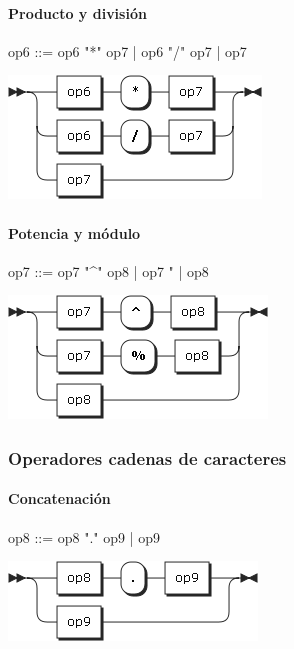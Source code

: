\paragraph{Producto y división}
\begin{multicols}{2}
\begin{myverbatim}      
op6  ::= op6 "*" op7
      |  op6 "/" op7
      |  op7
\end{myverbatim}  
\columnbreak	
\begin{center}
\includegraphics[scale=0.5]{diagram/op6.png} \\
\end{center}
\end{multicols}

\paragraph{Potencia y módulo}
\begin{multicols}{2}
\begin{myverbatim}      
op7  ::= op7 "^" op8
      |  op7 "%
      |  op8
\end{myverbatim}  
\columnbreak	
\begin{center}
\includegraphics[scale=0.5]{diagram/op7.png} \\
\end{center}
\end{multicols}

\subsubsection{Operadores cadenas de caracteres}
\paragraph{Concatenación}
\begin{multicols}{2}
\begin{myverbatim}      
op8 ::=  op8 "." op9
      |  op9
\end{myverbatim}  
\columnbreak	
\begin{center}
\includegraphics[scale=0.5]{diagram/op8.png} \\
\end{center}
\end{multicols}
